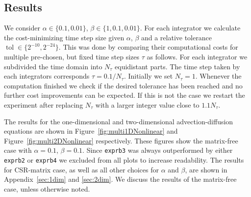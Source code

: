 \documentclass{scrartcl}
\begin{document}
	
	
	
	\subsection{Results} \label{sec:Experiment1dim}
	We consider $\alpha\in\{0.1,0.01\}$, $\beta\in\{1, 0.1, 0.01\}$. For each integrator we calculate the cost-minimizing time step size given $\alpha$, $\beta$ and a relative tolerance $\operatorname{tol}\in \{2^{-10},2^{-24}\}$. This was done by comparing their computational costs for multiple pre-chosen, but fixed time step sizes $\tau$ as follows. For each integrator we subdivided the time domain into $N_\tau$ equidistant parts. The time step taken by each integrators corresponds $\tau = 0.1/N_\tau$. Initially we set $N_\tau=1$. Whenever the computation finished we check if the desired tolerance has been reached and no further cost improvements can be expected. If this is not the case we restart the experiment after replacing $N_\tau$ with a larger integer value close to $1.1N_\tau$. 
	    
	The results for the one-dimensional and two-dimensional advection-diffusion equations are shown in Figure~\ref{fig:multi1DNonlinear} and Figure~\ref{fig:multi2DNonlinear} respectively. 
	These figures show the matrix-free case with $\alpha=0.1$, $\beta=0.1$. Since \texttt{exprb3} was always outperformed by either \texttt{exprb2} or \texttt{exprb4} we excluded from all plots to increase readability. The results for CSR-matrix case, as well as all other choices for $\alpha$ and $\beta$, are shown in Appendix~\ref{sec:1dim} and \ref{sec:2dim}. We discuss the results of the matrix-free case, unless otherwise noted.
	
\end{document}
